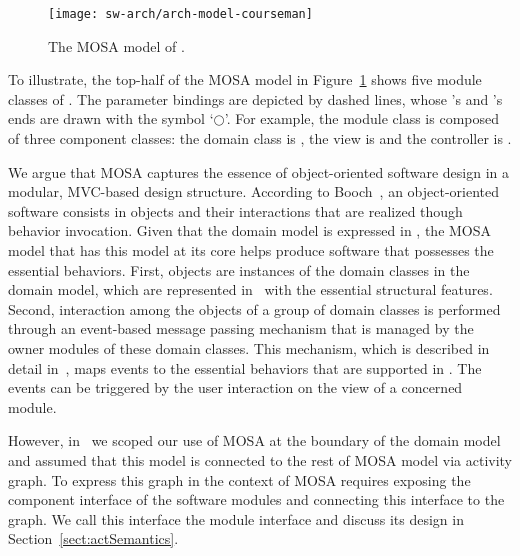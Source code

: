 \begin{figure}[ht]
	\centering
	\texttt{[image: sw-arch/arch-model-courseman]}
	\caption{The MOSA model of \courseman.} %
	\label{fig:arch-model-courseman}
\end{figure}

%
To illustrate, the top-half of the MOSA model in Figure~\ref{fig:arch-model-courseman} shows five module classes of \courseman. The parameter bindings are depicted by dashed lines, whose 's and 's ends are drawn with the symbol `$\bigcirc$'. 
%
For example, the module class  is composed of three component classes: the domain class is , the view is  and the controller is .

We argue that MOSA captures the essence of object-oriented software design in a modular, MVC-based design structure. According to Booch~\cite{booch_object-oriented_1986}, an object-oriented software consists in objects and their interactions that are realized though behavior invocation. Given that the domain model is expressed in \dcsl, the MOSA model that has this model at its core helps produce software that possesses the essential behaviors. First, objects are instances of the domain classes in the domain model, which are represented in \dcsl~with the essential structural features. Second, interaction among the objects of a group of domain classes is performed through an event-based message passing mechanism that is managed by the owner modules of these domain classes. This mechanism, which is described in detail in~\cite{le_jdomainapp_2017}, maps events to the essential behaviors that are supported in \dcsl. The events can be triggered by the user interaction on the view of a concerned module. 

However, in~\cite{le_domain_2018} we scoped our use of MOSA at the boundary of the domain model and assumed that this model is connected to the rest of MOSA model via activity graph. To express this graph in the context of MOSA requires exposing the component interface of the software modules and connecting this interface to the graph. We call this interface the module interface and discuss its design in Section~\ref{sect:actSemantics}. 

